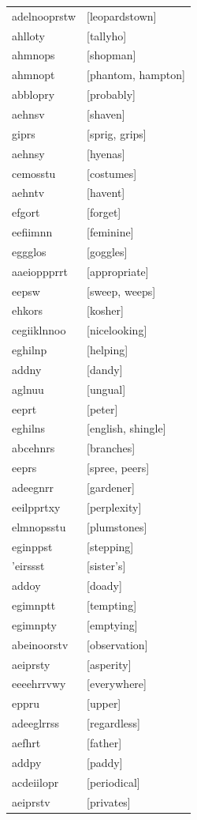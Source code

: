 \documentclass{article}
\begin{document}
\begin{tabular}{ll}
adelnooprstw & [leopardstown] \\
ahlloty & [tallyho] \\
ahmnops & [shopman] \\
ahmnopt & [phantom, hampton] \\
abblopry & [probably] \\
aehnsv & [shaven] \\
giprs & [sprig, grips] \\
aehnsy & [hyenas] \\
cemosstu & [costumes] \\
aehntv & [havent] \\
efgort & [forget] \\
eefiimnn & [feminine] \\
eggglos & [goggles] \\
aaeioppprrt & [appropriate] \\
eepsw & [sweep, weeps] \\
ehkors & [kosher] \\
cegiiklnnoo & [nicelooking] \\
eghilnp & [helping] \\
addny & [dandy] \\
aglnuu & [ungual] \\
eeprt & [peter] \\
eghilns & [english, shingle] \\
abcehnrs & [branches] \\
eeprs & [spree, peers] \\
adeegnrr & [gardener] \\
eeilpprtxy & [perplexity] \\
elmnopsstu & [plumstones] \\
eginppst & [stepping] \\
'eirssst & [sister's] \\
addoy & [doady] \\
egimnptt & [tempting] \\
egimnpty & [emptying] \\
abeinoorstv & [observation] \\
aeiprsty & [asperity] \\
eeeehrrvwy & [everywhere] \\
eppru & [upper] \\
adeeglrrss & [regardless] \\
aefhrt & [father] \\
addpy & [paddy] \\
acdeiilopr & [periodical] \\
aeiprstv & [privates] \\

\end{tabular}
\end{document}
